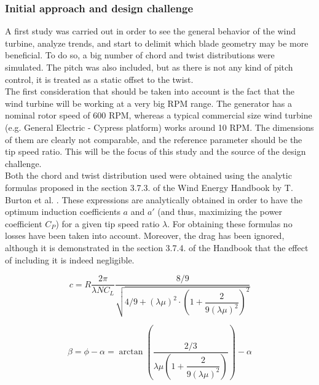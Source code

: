 \documentclass[../TFG_Report.tex]{subfiles}
\begin{document}
\subsubsection{Initial approach and design challenge}\label{sec:design_challenge}

A first study was carried out in order to see the general behavior of the wind turbine, analyze trends, and start to delimit which blade geometry may be more beneficial. To do so, a big number of chord and twist distributions were simulated. The pitch was also included, but as there is not any kind of pitch control, it is treated as a static offset to the twist. \\

The first consideration that should be taken into account is the fact that the wind turbine will be working at a very big RPM range. The generator has a nominal rotor speed of 600 RPM, whereas a typical commercial size wind turbine (e.g. General Electric - Cypress platform) works around 10 RPM. The dimensions of them are clearly not comparable, and the reference parameter should be the tip speed ratio. This will be the focus of this study and the source of the design challenge. \\

Both the chord and twist distribution used were obtained using the analytic formulas proposed in the section 3.7.3. of the Wind Energy Handbook by T. Burton et al. \cite{Handbook}. These expressions are analytically obtained in order to have the optimum induction coefficients $a$ and $a'$ (and thus, maximizing the power coefficient $C_P$) for a given tip speed ratio $\lambda$. For obtaining these formulas no losses have been taken into account. Moreover, the drag has been ignored, although it is demonstrated in the section 3.7.4. of the Handbook that the effect of including it is indeed negligible.   %

\begin{equation}\label{OptimalChord}
c = R \dfrac{2 \pi}{\lambda N C_L} \dfrac{8/9}{\sqrt{4/9+(\lambda \mu)^2  \cdot \left( 1+\dfrac{2}{9 (\lambda \mu)^2 } \right)^2 }}
\end{equation}

\begin{equation}\label{OptimalTwist}
\beta = \phi - \alpha = \arctan{\left(   \dfrac{2/3}{\lambda \mu \left( 1+\dfrac{2}{9 (\lambda \mu)^2}   \right)}   \right)} -\alpha
\end{equation}
\end{document}
